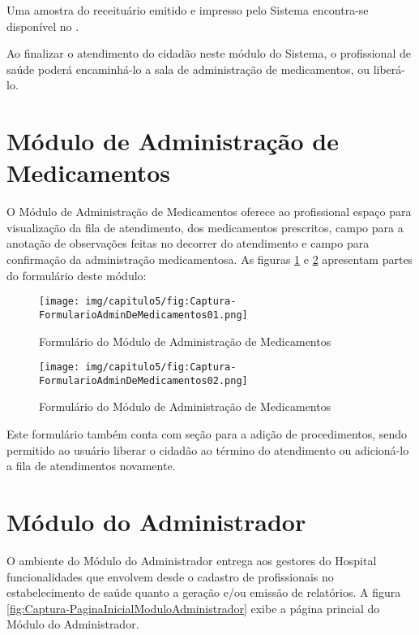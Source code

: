 Uma amostra do receituário emitido e impresso pelo Sistema encontra-se disponível no .

Ao finalizar o atendimento do cidadão neste módulo do Sistema, o profissional de saúde poderá encaminhá-lo a sala de administração de medicamentos, ou liberá-lo.

\section{Módulo de Administração de Medicamentos}

O Módulo de Administração de Medicamentos oferece ao profissional espaço para visualização da fila de atendimento, dos medicamentos prescritos, campo para a anotação de observações feitas no decorrer do atendimento e campo para confirmação da administração medicamentosa. As figuras \ref{fig:Captura-FormularioAdminDeMedicamentos01} e \ref{fig:Captura-FormularioAdminDeMedicamentos02} apresentam partes do formulário deste módulo:

\begin{figure}[H]
    \centering
     \caption{Formulário do Módulo de Administração de Medicamentos}
    \texttt{[image: img/capitulo5/fig:Captura-FormularioAdminDeMedicamentos01.png]}
    \label{fig:Captura-FormularioAdminDeMedicamentos01}
\end{figure}

\begin{figure}[H]
    \centering
     \caption{Formulário do Módulo de Administração de Medicamentos}
    \texttt{[image: img/capitulo5/fig:Captura-FormularioAdminDeMedicamentos02.png]}
    \label{fig:Captura-FormularioAdminDeMedicamentos02}
\end{figure}

Este formulário também conta com seção para a adição de procedimentos, sendo permitido ao usuário liberar o cidadão ao término do atendimento ou adicioná-lo a fila de atendimentos novamente.

\section{Módulo do Administrador}

O ambiente do Módulo do Administrador entrega aos gestores do Hospital funcionalidades que envolvem desde o cadastro de profissionais no estabelecimento de saúde quanto a geração e/ou emissão de relatórios. A figura \ref{fig:Captura-PaginaInicialModuloAdministrador} exibe a página princial do Módulo do Administrador.

